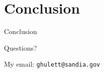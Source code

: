 
\section{Conclusion}

%
\begin{frame}{Conclusion}

Questions?

My email: \texttt{ghulett@sandia.gov}

\end{frame}
